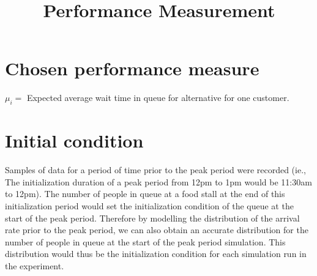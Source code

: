 \documentclass{article}
\begin{document}
\pagecolor{ultramarine}
\title{Performance Measurement}
\author{}
\date{}
\maketitle
\section{Chosen performance measure}
$\mu_i=$ Expected average wait time in queue for alternative for one customer. 
\section{Initial condition}
Samples of data for a period of time prior to the peak period were recorded (ie., The initialization duration of a peak period from 12pm to 1pm would be 11:30am to 12pm). The number of people in queue at a food stall at the end of this initialization period would set the initialization condition of the queue at the start of the peak period. Therefore by modelling the distribution of the arrival rate prior to the peak period, we can also obtain an accurate distribution for the number of people in queue at the start of the peak period simulation. This distribution would thus be the initialization condition for each simulation run in the experiment.
\end{document}

